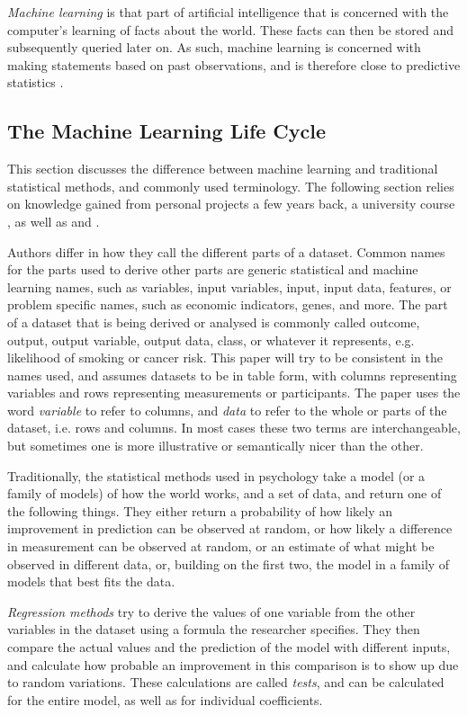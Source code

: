 \documentclass[a4paper,man,12pt,apacite,floatsintext,draftfirst]{apa6} %
\begin{document}
\emph{Machine learning} is that part of artificial intelligence that
is concerned with the computer's learning of facts about the world.
These facts can then be stored and subsequently queried later on.
As such, machine learning is concerned with making statements based
on past observations, and is therefore close to predictive statistics
\cite{wpML}.

\subsection{The Machine Learning Life Cycle}
This section discusses the difference between machine learning and traditional
statistical methods, and commonly used terminology.
The following section relies on knowledge gained from personal projects a few
years back, a university course \cite{psymeth}, as well as 
and .

Authors differ in how they call the different parts of a dataset.
Common names for the parts used to derive other parts are generic statistical
and machine learning names, such as variables, input variables, input, input data, features, or
problem specific names, such as economic indicators, genes, and more.
The part of a dataset that is being derived or analysed is commonly called outcome,
output, output variable, output data, class, or whatever it represents, e.g. likelihood of smoking or cancer risk.
This paper will try to be consistent in the names used, and assumes datasets
to be in table form, with columns representing variables and rows representing
measurements or participants.
The paper uses the word \emph{variable} to refer to columns, and \emph{data}
to refer to the whole or parts of the dataset, i.e. rows and columns.
In most cases these two terms are interchangeable, but sometimes one is more
illustrative or semantically nicer than the other.

Traditionally, the statistical methods used in psychology
take a model (or a family of models) of how the world works, and a set of data, and return one of
the following things.
They either return a probability of how likely an improvement in prediction
can be observed at random, or how likely a difference in measurement can be
observed at random, or an estimate of what might be observed in different data,
or, building on the first two, the model in a family of models that best fits the data.

\emph{Regression methods} try to derive the values of
one variable from the other variables in the dataset using a formula the
researcher specifies.
They then compare the actual values and the prediction of the model with
different inputs, and calculate how probable an improvement in this
comparison is to show up due to random variations.
These calculations are called \emph{tests}, and can be calculated for the
entire model, as well as for individual coefficients. \cite{wpRA}
\end{document}
